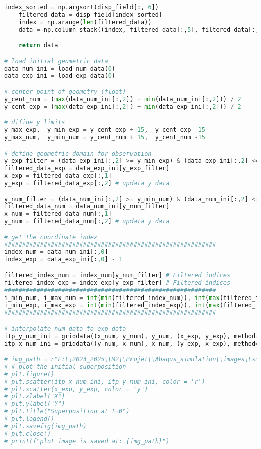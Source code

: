 \documentclass[12pt,a4paper]{article}
\begin{document}
\begin{lstlisting}[language=Python, caption={Optimisation superposition}]
    index_sorted = np.argsort(disp_field[:, 6])
    filtered_data = disp_field[index_sorted]
    index = np.arange(len(filtered_data))
    data = np.column_stack((index, filtered_data[:,5], filtered_data[:,6]))

    return data

# load initial geometric data
data_num_ini = load_num_data(0)
data_exp_ini = load_exp_data(0)

# center point of geometry (float)
y_cent_num = (max(data_num_ini[:,2]) + min(data_num_ini[:,2])) / 2
y_cent_exp = (max(data_exp_ini[:,2]) + min(data_exp_ini[:,2])) / 2

# difine y limits
y_max_exp,  y_min_exp = y_cent_exp + 15,  y_cent_exp -15 
y_max_num,  y_min_num = y_cent_num + 15,  y_cent_num -15

# define geometric domain for observation
y_exp_filter = (data_exp_ini[:,2] >= y_min_exp) & (data_exp_ini[:,2] <= y_max_exp)
filtered_data_exp = data_exp_ini[y_exp_filter]
x_exp = filtered_data_exp[:,1]
y_exp = filtered_data_exp[:,2] # updata y data

y_num_filter = (data_num_ini[:,2] >= y_min_num) & (data_num_ini[:,2] <= y_max_num)
filtered_data_num = data_num_ini[y_num_filter]
x_num = filtered_data_num[:,1]
y_num = filtered_data_num[:,2] # updata y data

# get the coordinate index
###########################################################
index_num = data_num_ini[:,0]
index_exp = data_exp_ini[:,0] - 1 

filtered_index_num = index_num[y_num_filter] # Filtered indices
filtered_index_exp = index_exp[y_exp_filter] # Filtered indices
###########################################################
i_min_num, i_max_num = int(min(filtered_index_num)), int(max(filtered_index_num))     #  minimum index and maximum index for useful numeric zone
i_min_exp, i_max_exp = int(min(filtered_index_exp)), int(max(filtered_index_exp))     #  minimum index and maximum index for useful experimental zone
###########################################################

# interpolate num data to exp data
itp_y_num_ini = griddata((x_num, y_num), y_num, (x_exp, y_exp), method='cubic')
itp_x_num_ini = griddata((y_num, x_num), x_num, (y_exp, x_exp), method='cubic')

# img_path = r"E:\\2023_2025\\M2\\Projet\\Abaqus_simulation\\images\\superposition_initial.png"
# # plot the initial superposition
# plt.figure()
# plt.scatter(itp_x_num_ini, itp_y_num_ini, color = 'r')
# plt.scatter(x_exp, y_exp, color = "y")
# plt.xlabel("X")
# plt.ylabel("Y")
# plt.title("Superposition at t=0")
# plt.legend()
# plt.savefig(img_path)
# plt.close()
# print(f"plot image is saved at: {img_path}")


\end{lstlisting}
\end{document}
